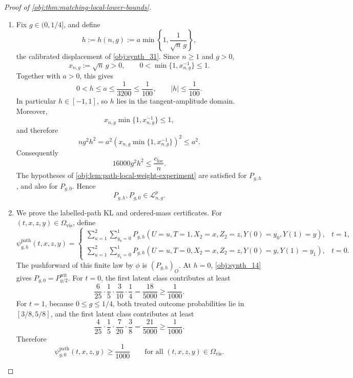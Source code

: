 \documentclass[11pt]{article}
\begin{document}
\begin{proof}[Proof of \cref{obj:thm:matching-local-lower-bounds}]
\begin{enumerate}
\item Fix \(g\in(0,1/4]\), and define
\[
h:=h(n,g):=a\min\left\{1,\frac1{\sqrt n\,g}\right\},
\]
the calibrated displacement of \cref{obj:synth_31}.  Since \(n\ge1\) and \(g>0\),
\[
x_{n,g}:=\sqrt n\,g>0,
\qquad
0<\min\{1,x_{n,g}^{-1}\}\le1.
\]
Together with \(a>0\), this gives
\[
0<h\le a\le\frac1{3200}\le\frac1{100},
\qquad
|h|\le\frac1{100}.
\]
In particular \(h\in[-1,1]\), so \(h\) lies in the tangent-amplitude domain.  Moreover,
\[
x_{n,g}\min\{1,x_{n,g}^{-1}\}\le1,
\]
and therefore
\[
n g^2 h^2
=
a^2\left(x_{n,g}\min\{1,x_{n,g}^{-1}\}\right)^2
\le
a^2 .
\]
Consequently
\[
16000g^2h^2\le\frac{c_{\mathrm{loc}}}{n}.
\]
The hypotheses of \cref{obj:lem:path-local-weight-experiment} are satisfied for \(P_{g,h}\), and also for \(P_{g,0}\).  Hence
\[
P_{g,h},P_{g,0}\in\mathcal L_{n,g}^{p}.
\] %

\item We prove the labelled-path KL and ordered-mass certificates.  For \((t,x,z,y)\in\Omega_{\mathrm{vis}}\), define
\[
\psi^{\mathrm{path}}_{g,h}(t,x,z,y)
=
\begin{cases}
\displaystyle
\sum_{u=1}^{2}\sum_{y_0=0}^{1}
P_{g,h}(U=u,T=1,X_2=x,Z_2=z,Y(0)=y_0,Y(1)=y),
& t=1,\\[1.2em]
\displaystyle
\sum_{u=1}^{2}\sum_{y_1=0}^{1}
P_{g,h}(U=u,T=0,X_2=x,Z_2=z,Y(0)=y,Y(1)=y_1),
& t=0.
\end{cases}
\]
The pushforward of this finite law by \(\phi\) is \((P_{g,h})_O\).  At \(h=0\), \cref{obj:synth_14} gives \(P_{g,0}=P_{g/2}^{\mathrm{wit}}\).  For \(t=0\), the first latent class contributes at least
\[
\frac6{25}\cdot\frac15\cdot\frac3{10}\cdot\frac14
=
\frac{18}{5000}
\ge
\frac1{1000}.
\]
For \(t=1\), because \(0\le g\le1/4\), both treated outcome probabilities lie in \([3/8,5/8]\), and the first latent class contributes at least
\[
\frac4{25}\cdot\frac15\cdot\frac7{20}\cdot\frac38
=
\frac{21}{5000}
\ge
\frac1{1000}.
\]
Therefore
\[
\psi^{\mathrm{path}}_{g,0}(t,x,z,y)\ge\frac1{1000}
\qquad
\text{for all }(t,x,z,y)\in\Omega_{\mathrm{vis}} .
\]


\end{enumerate}
\end{proof}
\end{document}
